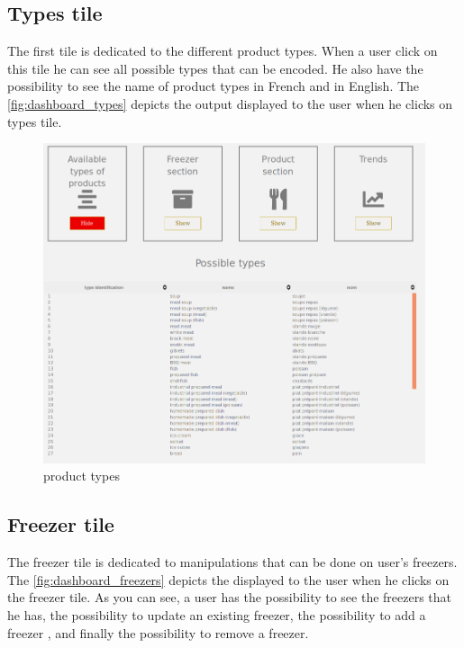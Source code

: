 \subsection{Types tile}
The first tile is dedicated to the different product types. When a user click on this tile he can see all possible types that can be encoded. He also have the possibility to see the name of product types in French and in English.
The \autoref{fig:dashboard_types} depicts the output displayed to the user when he clicks on types tile.

\begin{figure}[H]
\centering
\includegraphics[scale=0.25]{./images/dashboard_types.png}
\caption{product types}
\label{fig:dashboard_types}
\end{figure}

\subsection{Freezer tile}
The freezer tile is dedicated to manipulations that can be done on user's freezers. The \autoref{fig:dashboard_freezers} depicts the displayed to the user when he clicks on the freezer tile. As you can see, a user has the possibility to see the freezers that he has, the possibility to update an existing freezer, the possibility to add a freezer , and finally the possibility to remove a freezer.

